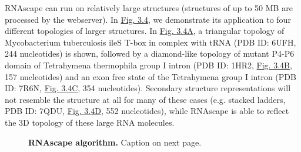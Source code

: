 RNAscape can run on relatively large structures (structures of up to 50 MB are processed by the webserver). In \hyperref[fig:rnascape4]{Fig. 3.4}, we demonstrate its application to four different topologies of larger structures. In \hyperref[fig:rnascape4]{Fig. 3.4A}, a triangular topology of Mycobacterium tuberculosis ileS T-box in complex with tRNA (PDB ID: 6UFH, 244 nucleotides) is shown, followed by a diamond-like topology of mutant P4-P6 domain of Tetrahymena thermophila group I intron (PDB ID: 1HR2, \hyperref[fig:rnascape4]{Fig. 3.4B}, 157 nucleotides) and an exon free state of the Tetrahymena group I intron (PDB ID: 7R6N, \hyperref[fig:rnascape4]{Fig. 3.4C}, 354 nucleotides). Secondary structure representations will not resemble the structure at all for many of these cases (e.g. stacked ladders, PDB ID: 7QDU, \hyperref[fig:rnascape4]{Fig. 3.4D}, 552 nucleotides), while RNAscape is able to reflect the 3D topology of these large RNA molecules.
\begin{center}
    \begin{figure}
        \caption[RNAscape algorithm.]{\textbf{RNAscape algorithm.} Caption on next page.}
  \label{fig:rnascape3}
\end{figure}
\end{center}
